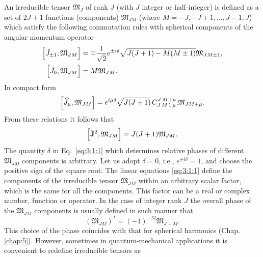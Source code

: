 An irreducible tensor $\mathfrak{M}_{J}$ of rank $J$ (with $J$ integer or half-integer) is defined as a set of $2 J+1$ functions (components) $\mathfrak{M}_{J M}$ (where $M=-J,-J+1, \ldots, J-1, J$) which satisfy the following commutation rules with spherical components of the angular momentum operator
\begin{align}
\left[\hat{J}_{ \pm 1}, \mathfrak{M}_{J M}\right]&=\mp \frac{1}{\sqrt{2}} e^{ \pm i \delta} \sqrt{J(J+1)-M(M \pm 1)} \mathfrak{M}_{J M \pm 1}  ,\label{eq:3:1:1}\\
\left[\hat{J}_{0}, \mathfrak{M}_{J M}\right]&=M \mathfrak{M}_{J M}. \notag
\end{align}
In compact form
\begin{equation}
\left[\widehat{J}_{\mu}, \mathfrak{M}_{J M}\right]=e^{i \mu \delta} \sqrt{J(J+1)} \,C_{J\,M\,1\,\mu}^{J\,M+\mu} \,\mathfrak{M}_{J M+\mu} .\label{eq:3:1:2}
\end{equation}
From these relations it follows that
\begin{equation}
\left[\hat{\mathbf{J}}^{2}, \mathfrak{M}_{J M}\right]=J(J+1) \mathfrak{M}_{J M}. \label{eq:3:1:3}
\end{equation}
The quantity $\delta$ in Eq.~\eqref{eq:3:1:1} which determines relative phases of different $\mathfrak{M}_{J M}$ components is arbitrary. Let us adopt $\delta=0$, i.e., $e^{ \pm i \delta}=1$, and choose the positive sign of the square root. The linear equations \eqref{eq:3:1:1} define the components of the irreducible tensor $\mathfrak{M}_{J M}$ within an arbitrary scalar factor, which is the same for all the components. This factor can be a real or complex number, function or operator. In the case of integer rank $J$ the overall phase of the $\mathfrak{M}_{J M}$ components is usually defined in such manner that
\begin{equation}
\left(\mathfrak{M}_{J M}\right)^{*}=(-1)^{-M} \mathfrak{M}_{J-M} . \label{eq:3:1:4}
\end{equation}
This choice of the phase coincides with that for spherical harmonics (Chap. \ref{chap:5}). However, sometimes in quantum-mechanical applications it is convenient to redefine irreducible tensors as
